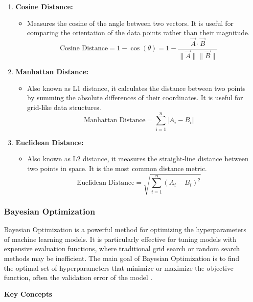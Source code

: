\documentclass[a4paper]{article}
\begin{document}
\begin{enumerate}
    \item \textbf{Cosine Distance:}
    \begin{itemize}
        \item Measures the cosine of the angle between two vectors. It is useful for comparing the orientation of the data points rather than their magnitude.
        \[
        \text{Cosine Distance} = 1 - \cos(\theta) = 1 - \frac{\vec{A} \cdot \vec{B}}{\|\vec{A}\| \|\vec{B}\|}
        \]
    \end{itemize}
    
    \item \textbf{Manhattan Distance:}
    \begin{itemize}
        \item Also known as L1 distance, it calculates the distance between two points by summing the absolute differences of their coordinates. It is useful for grid-like data structures.
        \[
        \text{Manhattan Distance} = \sum_{i=1}^{n} | A_i - B_i |
        \]
    \end{itemize}
    
    \item \textbf{Euclidean Distance:}
    \begin{itemize}
        \item Also known as L2 distance, it measures the straight-line distance between two points in space. It is the most common distance metric.
        \[
        \text{Euclidean Distance} = \sqrt{\sum_{i=1}^{n} (A_i - B_i)^2}
        \]
    \end{itemize}
    
\end{enumerate}


\subsubsection{Bayesian Optimization}

Bayesian Optimization is a powerful method for optimizing the hyperparameters of machine learning models. It is particularly effective for tuning models with expensive evaluation functions, where traditional grid search or random search methods may be inefficient. The main goal of Bayesian Optimization is to find the optimal set of hyperparameters that minimize or maximize the objective function, often the validation error of the model \citep{hyperparameter_Bayesian}.

\textbf{Key Concepts}
\end{document}
